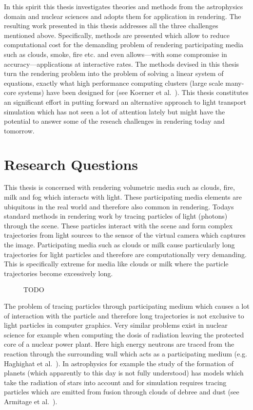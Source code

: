 In this spirit this thesis investigates theories and methods from the astrophysics domain and nuclear sciences and adopts them for application in rendering. The resulting work presented in this thesis addresses all the three challenges mentioned above. Specifically, methods are presented which allow to reduce computational cost for the demanding problem of rendering participating media such as clouds, smoke, fire etc. and even allows---with some compromise in accuracy---applications at interactive rates. The methods devised in this thesis turn the rendering problem into the problem of solving a linear system of equations, exactly what high performance computing clusters (large scale many-core systems) have been designed for (see Koerner et al.~\cite{Koerner17}). This thesis constitutes an significant effort in putting forward an alternative approach to light transport simulation which has not seen a lot of attention lately but might have the potential to answer some of the reseach challenges in rendering today and tomorrow.


\section{Research Questions}

This thesis is concerned with rendering volumetric media such as clouds, fire, milk and fog which interacts with light. These participating media elements are ubiquitous in the real world and therefore also common in rendering. Todays standard methods in rendering work by tracing particles of light (photons) through the scene. These particles interact with the scene and form complex trajectories from light sources to the sensor of the virtual camera which captures the image. Participating media such as clouds or milk cause particularly long trajectories for light particles and therefore are computationally very demanding. This is specifically extreme for media like clouds or milk where the particle trajectories become excessively long.
\begin{figure}[ht]
\centering
{}
\caption{TODO}
\label{fig:intro_participating_media_examples}
\end{figure}

The problem of tracing particles through participating medium which causes a lot of interaction with the particle and therefore long trajectories is not exclusive to light particles in computer graphics. Very similar problems exist in nuclear science for example when computing the dosis of radiation leaving the protected core of a nuclear power plant. Here high energy neutrons are traced from the reaction through the surrounding wall which acts as a participating medium (e.g. Haghighat et al.~\cite{Haghighat03}). In astrophysics for example the study of the formation of planets (which apparently to this day is not fully understood) has models which take the radiation of stars into account and for simulation requires tracing particles which are emitted from fusion through clouds of debree and dust (see Armitage et al.~\cite{Armitage11}).

